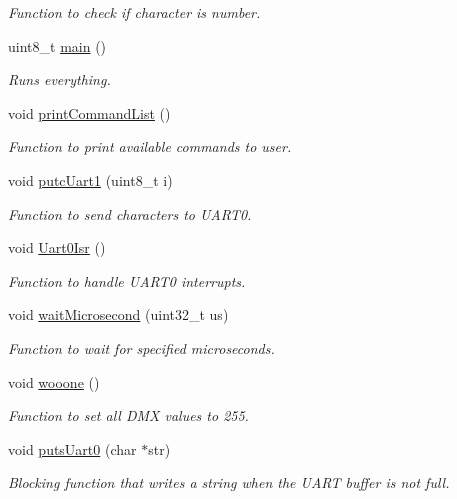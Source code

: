 \begin{DoxyCompactItemize}
\begin{DoxyCompactList}\small\item\em Function to check if character is number. \end{DoxyCompactList}\item 
uint8\+\_\+t \mbox{\hyperlink{satej__matthew_8c_a922afd31fa147cb51a9b28ce18b3e30e}{main}} ()
\begin{DoxyCompactList}\small\item\em Runs everything. \end{DoxyCompactList}\item 
void \mbox{\hyperlink{satej__matthew_8c_a9657c6b2d1c183503ca49b71da13e9e4}{print\+Command\+List}} ()
\begin{DoxyCompactList}\small\item\em Function to print available commands to user. \end{DoxyCompactList}\item 
void \mbox{\hyperlink{satej__matthew_8c_a6c61bcdd147e256a7e6b05b34fb783bc}{putc\+Uart1}} (uint8\+\_\+t i)
\begin{DoxyCompactList}\small\item\em Function to send characters to U\+A\+R\+T0. \end{DoxyCompactList}\item 
void \mbox{\hyperlink{satej__matthew_8c_a039b2e346ff80ac384bb076fc5290996}{Uart0\+Isr}} ()
\begin{DoxyCompactList}\small\item\em Function to handle U\+A\+R\+T0 interrupts. \end{DoxyCompactList}\item 
void \mbox{\hyperlink{satej__matthew_8c_af97018ae05e94f602f956c08ef08c36c}{wait\+Microsecond}} (uint32\+\_\+t us)
\begin{DoxyCompactList}\small\item\em Function to wait for specified microseconds. \end{DoxyCompactList}\item 
void \mbox{\hyperlink{satej__matthew_8c_a35d3aeb4661540f67e367e4e328c6c88}{wooone}} ()
\begin{DoxyCompactList}\small\item\em Function to set all D\+MX values to 255. \end{DoxyCompactList}\item 
void \mbox{\hyperlink{satej__matthew_8c_af4adb618930ee1a928705aec083cf726}{puts\+Uart0}} (char $\ast$str)
\begin{DoxyCompactList}\small\item\em Blocking function that writes a string when the U\+A\+RT buffer is not full. \end{DoxyCompactList}\item 

\end{DoxyCompactItemize}
